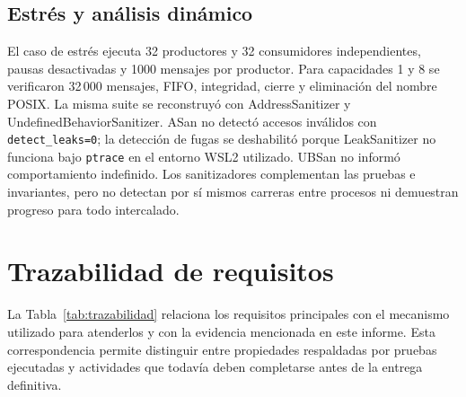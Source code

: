 \documentclass[conference]{IEEEtran}
\begin{document}
\subsection{Estrés y análisis dinámico}
El caso de estrés ejecuta 32 productores y 32 consumidores independientes, pausas desactivadas y 1000 mensajes por productor. Para capacidades 1 y 8 se verificaron 32\,000 mensajes, FIFO, integridad, cierre y eliminación del nombre POSIX. La misma suite se reconstruyó con AddressSanitizer y UndefinedBehaviorSanitizer. ASan no detectó accesos inválidos con \texttt{detect\_leaks=0}; la detección de fugas se deshabilitó porque LeakSanitizer no funciona bajo \texttt{ptrace} en el entorno WSL2 utilizado. UBSan no informó comportamiento indefinido. Los sanitizadores complementan las pruebas e invariantes, pero no detectan por sí mismos carreras entre procesos ni demuestran progreso para todo intercalado.

\section{Trazabilidad de requisitos}
La Tabla~\ref{tab:trazabilidad} relaciona los requisitos principales con el mecanismo utilizado para atenderlos y con la evidencia mencionada en este informe. Esta correspondencia permite distinguir entre propiedades respaldadas por pruebas ejecutadas y actividades que todavía deben completarse antes de la entrega definitiva.
\end{document}

